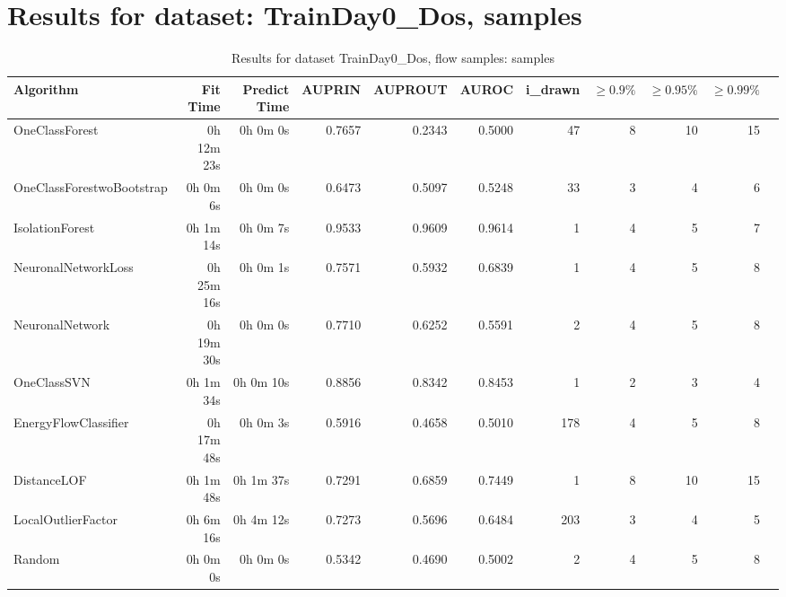 \documentclass{article}
\begin{document}
\section*{Results for dataset: TrainDay0_Dos, samples}
\begin{table}[h!]
\centering
\caption{Results for dataset TrainDay0_Dos, flow samples: samples}
\begin{tabular}{lrrrrrrrrrr}
\toprule
Algorithm & Fit Time & Predict Time & AUPRIN & AUPROUT & AUROC & i\_drawn & $\geq 0.9\%$ & $\geq 0.95\%$ & $\geq 0.99\%$ \\
\midrule
OneClassForest & 0h 12m 23s & 0h 0m 0s & 0.7657 & 0.2343 & 0.5000 & 47 & 8 & 10 & 15 \\
OneClassForestwoBootstrap & 0h 0m 6s & 0h 0m 0s & 0.6473 & 0.5097 & 0.5248 & 33 & 3 & 4 & 6 \\
IsolationForest & 0h 1m 14s & 0h 0m 7s & 0.9533 & 0.9609 & 0.9614 & 1 & 4 & 5 & 7 \\
NeuronalNetworkLoss & 0h 25m 16s & 0h 0m 1s & 0.7571 & 0.5932 & 0.6839 & 1 & 4 & 5 & 8 \\
NeuronalNetwork & 0h 19m 30s & 0h 0m 0s & 0.7710 & 0.6252 & 0.5591 & 2 & 4 & 5 & 8 \\
OneClassSVN & 0h 1m 34s & 0h 0m 10s & 0.8856 & 0.8342 & 0.8453 & 1 & 2 & 3 & 4 \\
EnergyFlowClassifier & 0h 17m 48s & 0h 0m 3s & 0.5916 & 0.4658 & 0.5010 & 178 & 4 & 5 & 8 \\
DistanceLOF & 0h 1m 48s & 0h 1m 37s & 0.7291 & 0.6859 & 0.7449 & 1 & 8 & 10 & 15 \\
LocalOutlierFactor & 0h 6m 16s & 0h 4m 12s & 0.7273 & 0.5696 & 0.6484 & 203 & 3 & 4 & 5 \\
Random & 0h 0m 0s & 0h 0m 0s & 0.5342 & 0.4690 & 0.5002 & 2 & 4 & 5 & 8 \\
\bottomrule
\end{tabular}
\end{table}
\end{document}
